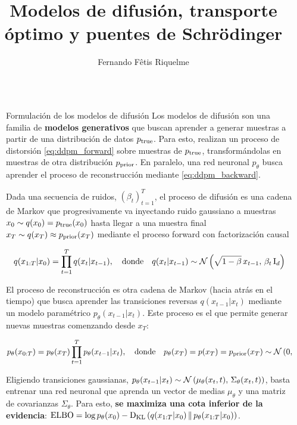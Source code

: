 \documentclass[final]{beamer}
\title{Modelos de difusión, transporte óptimo y puentes de Schrödinger}
\author{Fernando Fêtis Riquelme}
\institute[shortinst]{DIM/MDS - Universidad de Chile}
\newlength{\sepwidth}
\newlength{\colwidth}
\newcommand{\separatorcolumn}{\begin{column}{\sepwidth}\end{column}}
\begin{document}
\begin{frame}[t]
  \begin{columns}[t]
    \separatorcolumn

    \begin{column}{\colwidth}

      \begin{block}{Formulación de los modelos de difusión}
        Los modelos de difusión son una familia de \textbf{modelos generativos} que buscan aprender a generar muestras a partir de una distribución de datos $p_{\operatorname{true}}$. Para esto, realizan un proceso de distorsión \eqref{eq:ddpm_forward} sobre muestras de $p_{\operatorname{true}}$, transformándolas en muestras de otra distribución $p_{\operatorname{prior}}$. En paralelo, una red neuronal $p_\theta$ busca aprender el proceso de reconstrucción mediante \eqref{eq:ddpm_backward}.


        Dada una secuencia de ruidos, $(\beta_t)_{t=1}^T$, el proceso de difusión es una cadena de Markov que progresivamente va inyectando ruido gaussiano a muestras $x_0\sim q(x_0)=p_{\operatorname{true}}(x_0)$ hasta llegar a una muestra final $x_T\sim q(x_T)\approx p_{\operatorname{prior}}(x_T)$ mediante el proceso forward con factorización causal

        \begin{equation}
          \label{eq:ddpm_forward}
          q(x_{1:T}|x_0) = \prod_{t=1}^{T} q(x_t|x_{t-1}),
          \quad\text{donde}\quad
          q(x_t|x_{t-1}) \sim \mathcal{N}\left(\sqrt{1-\beta}\, x_{t-1},\,\beta_t\operatorname{I}_{d}\right)
        \end{equation}

        El proceso de reconstrucción es otra cadena de Markov (hacia atrás en el tiempo) que busca aprender las transiciones reversas $q(x_{t-1}|x_t)$ mediante un modelo paramétrico $p_\theta(x_{t-1}|x_t)$. Este proceso es el que permite generar nuevas muestras comenzando desde $x_T$:

        \begin{equation}
          \label{eq:ddpm_backward}
          p_\theta(x_{0:T}) = p_\theta(x_T)\prod_{t=1}^{T} p_\theta(x_{t-1}|x_t),
          \quad\text{donde}\quad
          p_\theta(x_T) = p(x_T) = p_{\operatorname{prior}}(x_T) \sim \mathcal{N}\left(0,\,\operatorname{I}_{d}\right)
        \end{equation}

        Eligiendo transiciones gaussianas, $p_\theta(x_{t-1}|x_t)\sim\mathcal{N}\left(\mu_\theta(x_t,t),\,\Sigma_\theta(x_t,t)\right)$, basta entrenar una red neuronal que aprenda un vector de medias $\mu_\theta$ y una matriz de covarianzas $\Sigma_\theta$. Para esto, \textbf{se maximiza una cota inferior de la evidencia}: $\operatorname{ELBO} = \log p_\theta(x_0) - \operatorname{D_{KL}}\left(q(x_{1:T}|x_0)\,\|\,p_\theta(x_{1:T}|x_0)\right)$.


\end{block}
\end{column}
\end{columns}
\end{frame}
\end{document}
